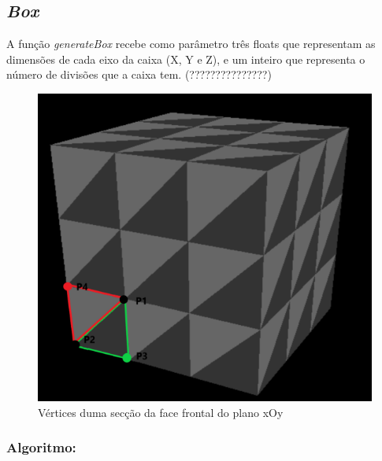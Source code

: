 \documentclass[a4paper]{article}
\begin{document}
\newpage

\subsection{\textit{Box}}
\label{sec:box}
A função \textit{generateBox} recebe como parâmetro três floats que representam as dimensões de cada eixo da caixa (X, Y e Z), e um inteiro que representa o número de divisões que a caixa tem. (???????????????)

\begin{figure}[H]
\centering
\includegraphics[scale=0.55]{box.png}
\caption{Vértices duma secção da face frontal do plano xOy}
\label{img:Box}
\end{figure}

  \vspace{0.2cm}

\subsubsection{Algoritmo:}
\end{document}
